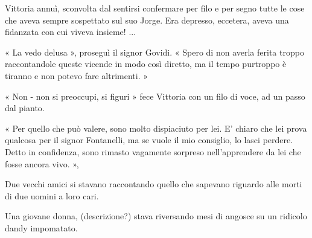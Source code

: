 Vittoria annuì, sconvolta dal sentirsi confermare per filo e per segno tutte le cose che aveva sempre sospettato sul suo Jorge. Era depresso, eccetera, aveva una fidanzata con cui viveva insieme! ...

« La vedo delusa », proseguì il signor Govidi. « Spero di non averla ferita troppo raccontandole queste vicende in modo così diretto, ma il tempo purtroppo è tiranno e non potevo fare altrimenti. »

« Non - non si preoccupi, si figuri » fece Vittoria con un filo di voce, ad un passo dal pianto.

« Per quello che può valere, sono molto dispiaciuto per lei. E' chiaro che lei prova qualcosa per il signor Fontanelli, ma se vuole il mio consiglio, lo lasci perdere. Detto in confidenza, sono rimasto vagamente sorpreso nell'apprendere da lei che fosse ancora vivo.  »,



Due vecchi amici si stavano raccontando quello che sapevano riguardo alle morti di due uomini a loro cari.

Una giovane donna, (descrizione?) stava riversando mesi di angosce su un ridicolo dandy impomatato.

